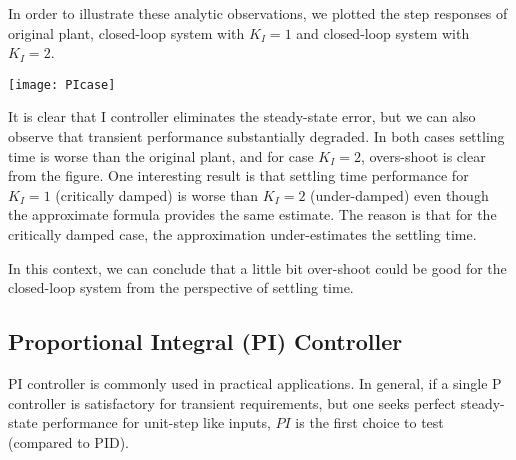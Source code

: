 \documentclass[twoside]{article}
\begin{document}
In order to illustrate these analytic observations, 
we plotted the step responses of original plant, 
closed-loop system with $K_I = 1$ and
closed-loop system with $K_I = 2$. 

\vspace{12 pt}

  \begin{minipage}[h]{1\linewidth}
    \begin{center}
      \texttt{[image: PIcase]}
    \end{center}
  \end{minipage}

\vspace{12 pt}

It is clear that I controller eliminates the
steady-state error, but we can also observe that
transient performance substantially degraded. In both cases
settling time is worse than the original plant,
and for case $K_I = 2$, overs-shoot is clear from the
figure. One interesting result is that settling time performance
for $K_I = 1$ (critically damped) is worse than $K_I = 2$
(under-damped) even though the approximate formula
provides the same estimate. The reason is that for the critically
damped case, the approximation under-estimates 
the settling time. 

In this context, we can conclude that
a little bit over-shoot could be good for the closed-loop
system from the perspective of settling time. 

\subsection{Proportional Integral (PI) Controller}

PI controller is commonly used in practical applications. 
In general, if a single P controller is satisfactory for 
transient requirements, but one seeks perfect steady-state
performance for unit-step like inputs, $PI$ is the first choice to
test (compared to PID). 
\end{document}
